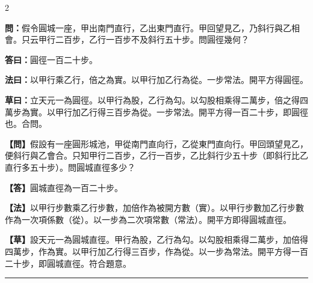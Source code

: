 \documentclass[11pt,a4paper]{article}
\newcommand{\longline}{\noindent\rule{\textwidth}{0.4pt}}
\newcommand{\wenC}[1]{\par\noindent\textbf{\textcolor{probcolor}{問：}}{#1}\par}
\newcommand{\daC}[1]{\par\noindent\textbf{\textcolor{anscolor}{答曰：}}{#1}\par}
\newcommand{\fayueC}[1]{\par\noindent\textbf{\textcolor{methodcolor}{法曰：}}{#1}\par}
\newcommand{\caoyueC}[1]{\par\noindent\textbf{草曰：}{#1}\par}
\newcommand{\wenM}[1]{\par\noindent\textbf{\textcolor{probcolor}{【問】}}{#1}\par}
\newcommand{\daM}[1]{\par\noindent\textbf{\textcolor{anscolor}{【答】}}{#1}\par}
\newcommand{\fayueM}[1]{\par\noindent\textbf{\textcolor{methodcolor}{【法】}}{#1}\par}
\newcommand{\caoyueM}[1]{\par\noindent\textbf{【草】}{#1}\par}
\begin{document}
\begin{paracol}{2}

\wenC{假令圓城一座，甲出南門直行，乙出東門直行。甲回望見乙，乃斜行與乙相會。只云甲行二百步，乙行一百步不及斜行五十步。問圓徑幾何？}

\daC{圓徑一百二十步。}

\fayueC{以甲行乘乙行，倍之為實。以甲行加乙行為從。一步常法。開平方得圓徑。}

\caoyueC{立天元一為圓徑。以甲行為股，乙行為勾。以勾股相乘得二萬步，倍之得四萬步為實。以甲行加乙行得三百步為從。一步常法。開平方得一百二十步，即圓徑也。合問。}

\switchcolumn

\wenM{假設有一座圓形城池，甲從南門直向行，乙從東門直向行。甲回頭望見乙，便斜行與乙會合。只知甲行二百步，乙行一百步，乙比斜行少五十步（即斜行比乙直行多五十步）。問圓城直徑多少？}

\daM{圓城直徑為一百二十步。}

\fayueM{以甲行步數乘乙行步數，加倍作為被開方數（實）。以甲行步數加乙行步數作為一次項係數（從）。以一步為二次項常數（常法）。開平方即得圓城直徑。}

\caoyueM{設天元一為圓城直徑。甲行為股，乙行為勾。以勾股相乘得二萬步，加倍得四萬步，作為實。以甲行加乙行得三百步，作為從。以一步為常法。開平方得一百二十步，即圓城直徑。符合題意。}

\end{paracol}

\vspace{0.3cm}
\longline
\end{document}
